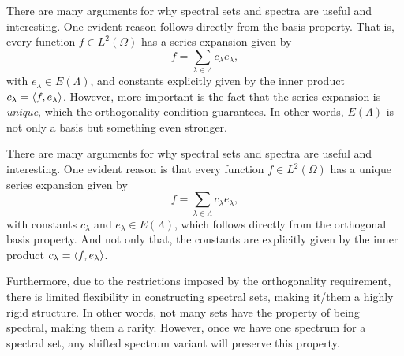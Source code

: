 \documentclass[../thesis.tex]{subfiles}
\begin{document}
There are many arguments for why spectral sets and spectra are useful and interesting. One evident reason follows directly from the basis property. That is, every function $f \in L^2(\Omega)$ has a series expansion given by
\begin{equation}
    f = \sum_{\lambda \in \Lambda} c_{\lambda} e_{\lambda},
\end{equation}
with $e_\lambda \in E(\Lambda)$, and constants explicitly given by the inner product $c_{\lambda}=\langle f,e_{\lambda}\rangle$. However, more important is the fact that the series expansion is \emph{unique}, which the orthogonality condition guarantees. In other words, $E(\Lambda)$ is not only a basis but something even stronger.

There are many arguments for why spectral sets and spectra are useful and interesting. One evident reason is that every function $f \in L^2(\Omega)$ has a unique series expansion given by
\begin{equation}
    f = \sum_{\lambda \in \Lambda} c_{\lambda} e_{\lambda},
\end{equation}
with constants $c_{\lambda}$ and $e_\lambda \in E(\Lambda)$, which follows directly from the orthogonal basis property. And not only that, the constants are explicitly given by the inner product $c_{\lambda}=\langle f,e_{\lambda}\rangle$. %

Furthermore, due to the restrictions imposed by the orthogonality requirement, there is limited flexibility in constructing spectral sets, making it/them a highly rigid structure. In other words, not many sets have the property of being spectral, making them a rarity. However, once we have one spectrum for a spectral set, any shifted spectrum variant will preserve this property. 
\end{document}
